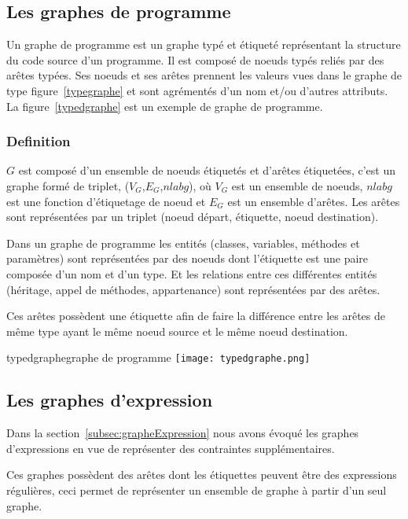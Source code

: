 \documentclass[a4paper, 12pt]{article}
\begin{document}
  \subsection{Les graphes de programme}

  Un graphe de programme est un graphe typé et étiqueté représentant la structure du code source d'un programme.
  Il est composé de noeuds typés reliés par des arêtes typées. Ses noeuds et ses arêtes prennent les valeurs vues dans le graphe de type figure~\ref{typegraphe}
  et sont agrémentés d'un nom et/ou d'autres attributs. La figure~\ref{typedgraphe} est un exemple de graphe de programme.

  \subsubsection{Definition}
  \(G \) est composé d'un ensemble de noeuds étiquetés et d'arêtes étiquetées, c'est un graphe formé de triplet, ({$V_G$},{$E_G$},\(nlabg \)), où {$V_G$} est un ensemble de noeuds,
  \(nlabg \) est une fonction d'étiquetage de noeud et {$E_G$} est un ensemble d'arêtes. Les arêtes sont représentées par un triplet (noeud départ, étiquette, noeud destination).

  Dans un graphe de programme les entités (classes, variables, méthodes et paramètres) sont représentées par des noeuds dont l'étiquette est une paire composée d'un nom et d'un type.
  Et les relations entre ces différentes entités (héritage, appel de méthodes, appartenance) sont représentées par des arêtes.

  Ces arêtes possèdent une étiquette afin de faire la différence entre les arêtes de même type ayant le même noeud source et le même noeud destination.

  \begin{myfig}{typedgraphe}{graphe de programme}
    \texttt{[image: typedgraphe.png]}
  \end{myfig}

  \subsection{Les graphes d'expression}

  Dans la section~\ref{subsec:grapheExpression} nous avons évoqué les graphes d'expressions en vue de représenter des contraintes supplémentaires.

  Ces graphes possèdent des arêtes dont les étiquettes peuvent être des expressions régulières, ceci permet de représenter un ensemble de graphe à partir d'un seul graphe.
\end{document}
